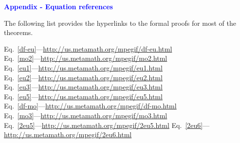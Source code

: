 \documentclass{slides}
\begin{document}
\begin{slide}

\begin{center}
\textcolor{blue}{\textbf{Appendix - Equation references}}
\end{center}

The following list provides the hyperlinks to the formal proofs
for most of the theorems.

Eq.~\ref{df-eu}---\url{http://us.metamath.org/mpegif/df-eu.html}         \\
Eq.~\ref{mo2}---\url{http://us.metamath.org/mpegif/mo2.html}             \\
Eq.~\ref{eu1}---\url{http://us.metamath.org/mpegif/eu1.html}             \\
Eq.~\ref{eu2}---\url{http://us.metamath.org/mpegif/eu2.html}             \\
Eq.~\ref{eu3}---\url{http://us.metamath.org/mpegif/eu3.html}             \\
Eq.~\ref{eu5}---\url{http://us.metamath.org/mpegif/eu5.html}             \\
Eq.~\ref{df-mo}---\url{http://us.metamath.org/mpegif/df-mo.html}         \\
Eq.~\ref{mo3}---\url{http://us.metamath.org/mpegif/mo3.html}             \\
Eq.~\ref{2eu5}---\url{http://us.metamath.org/mpegif/2eu5.html}
Eq.~\ref{2eu6}---\url{http://us.metamath.org/mpegif/2eu6.html}           \\

\end{slide}
\end{document}
